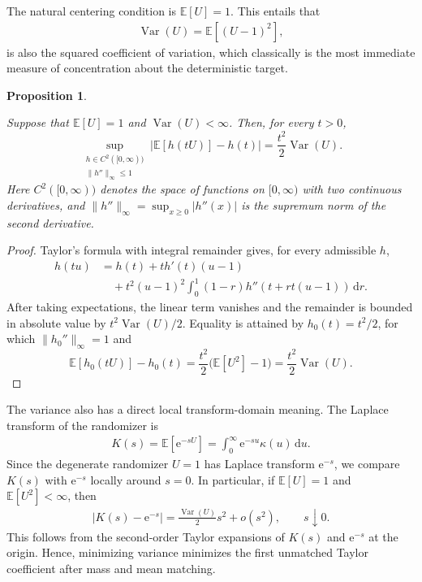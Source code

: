 \documentclass[11pt]{article}
\numberwithin{equation}{section}
\newtheorem{proposition}[theorem]{Proposition}
\theoremstyle{definition}
\theoremstyle{remark}
\newcommand{\E}{\mathbb E}
\newcommand{\Var}{\operatorname{Var}}
\newcommand{\dd}{\,\mathrm d}
\newcommand{\e}{\mathrm e}
\begin{document}
The natural centering condition is $\E[U]=1$. This entails that
\begin{align*}
  \Var(U)=\E[(U-1)^2],
\end{align*}
is also the squared coefficient of variation, which classically is the most immediate measure
of concentration about the deterministic target.

\begin{proposition}
\label{rand:prop:error-bound}

Suppose that $\E[U]=1$ and $\Var(U)<\infty$. Then, for every $t>0$,
\begin{equation*}
 \sup_{\substack{h\in C^2([0,\infty))\\ \lVert h''\rVert_\infty\leq1}}
 \left|\E[h(tU)]-h(t)\right|
 =\frac{t^2}{2}\Var(U).
\end{equation*}
Here $C^2([0,\infty))$ denotes the space of functions on
$[0,\infty)$ with two continuous derivatives, and
$\lVert h''\rVert_\infty=\sup_{x\geq0}|h''(x)|$ is the supremum norm of the
second derivative.
\end{proposition}


\begin{proof}

Taylor's formula with integral remainder gives, for every admissible $h$,
\begin{align*}
 h(tu)
 &=h(t)+t h'(t)(u-1)\\
 &\quad+t^2(u-1)^2
 \int_0^1(1-r)h''\left(t+rt(u-1)\right)\dd r.
\end{align*}
After taking expectations, the linear term vanishes and the remainder is
bounded in absolute value by $t^2\Var(U)/2$. Equality is attained by
$h_0(t)=t^2/2$, for which $\lVert h_0''\rVert_\infty=1$ and
\[
 \E[h_0(tU)]-h_0(t)=\frac{t^2}{2}\bigl(\E[U^2]-1\bigr)
 =\frac{t^2}{2}\Var(U).
\]

\end{proof}


The variance also has a direct local transform-domain meaning. The Laplace
transform of the randomizer is
\begin{align*}
  K(s)=\E[\e^{-sU}]
      =\int_0^\infty \e^{-su}\kappa(u)\dd u.
\end{align*}
Since the degenerate randomizer $U=1$ has Laplace transform $\e^{-s}$, we compare $K(s)$ with $\e^{-s}$ locally around $s=0$. In particular, if $\E[U]=1$ and $\E[U^2]<\infty$, then
\begin{align*}
  \mathopen{{\lvert}}K(s)-\e^{-s}\mathclose{{\rvert}}
  =\frac{\Var(U)}2s^2+o(s^2),
  \qquad s\downarrow0.
\end{align*}
This follows from the second-order Taylor expansions of $K(s)$ and $\e^{-s}$
at the origin.
Hence, minimizing variance minimizes
the first unmatched Taylor coefficient after mass and mean matching. 
\end{document}
